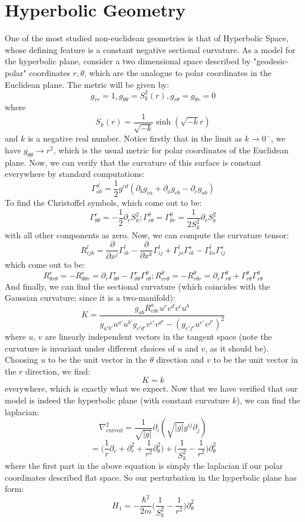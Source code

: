 \documentclass[12pt]{article}
\begin{document}
\section{Hyperbolic Geometry}
One of the most studied non-euclidean geometries is that of Hyperbolic Space, whose defining feature is a constant negative sectional curvature. As a model for the hyperbolic plane, consider a two dimensional space described by "geodesic-polar" coordinates $r, \theta$, which are the analogue to polar coordinates in the Euclidean plane. The metric will be given by:
$$g_{rr} = 1, g_{\theta \theta} = S_k^2(r), g_{r \theta} = g_{\theta r} = 0$$
where
$$S_k(r) = \frac{1}{\sqrt{-k}} \sinh(\sqrt{-k} r)$$
and $k$ is a negative real number. Notice firstly that in the limit as $k \to 0^-$, we have $g_{\theta \theta} \to r^2$, which is the usual metric for polar coordinates of the Euclidean plane. Now, we can verify that the curvature of this surface is constant everywhere by standard computations:
$$\Gamma^d_{ab} = \frac{1}{2} g^{cd}(\partial_b g_{ca} + \partial_a g_{cb} - \partial_c g_{ab})$$
To find the Christoffel symbols, which come out to be:
$$\Gamma^{r}_{\theta \theta} = - \frac{1}{2} \partial_r S_k^2; \Gamma^\theta_{r \theta} = \Gamma^\theta_{\theta r} = \frac{1}{2 S_k^2} \partial_r S_k^2$$
with all other components as zero. Now, we can compute the curvature tensor:
$$R^l_{ijk} = \frac{\partial}{\partial x^j} \Gamma^{l}_{ik} - \frac{\partial}{\partial x^k} \Gamma^l_{ij} + \Gamma^l_{js}\Gamma^s_{ik} - \Gamma^l_{ks} \Gamma^s_{ij}$$
which come out to be:
$$R^r_{\theta r \theta} = -R^r_{\theta \theta r} = \partial_r \Gamma^r_{\theta \theta} - \Gamma^r_{\theta \theta} \Gamma^\theta_{r \theta}; R^{\theta}_{r r \theta} = - R^\theta_{r \theta r} = \partial_r \Gamma^\theta_{r \theta} + \Gamma^{\theta}_{r \theta}\Gamma^{\theta}_{r \theta}$$
And finally, we can find the sectional curvature (which coincides with the Gaussian curvature; since it is a two-manifold):
$$K = \frac{g_{ab}R^{a}_{cde}u^ev^dv^cu^b}{g_{a'b'}u^{a'}u^{b'}g_{c'd'}v^{c'}v^{d'} - (g_{e'f'}u^{e'}v^{f'})^2}$$
where $u$, $v$ are linearly independent vectors in the tangent space (note the curvature is invariant under different choices of $u$ and $v$, as it should be). Choosing $u$ to be the unit vector in the $\theta$ direction and $v$ to be the unit vector in the $r$ direction, we find:
$$K = k$$
everywhere, which is exactly what we expect. Now that we have verified that our model is indeed the hyperbolic plane (with constant curvature $k$), we can find the laplacian:
$$\nabla^2_{\text{curved}} = \frac{1}{\sqrt{|g|}} \partial_i (\sqrt{|g|} g^{ij} \partial_j)$$
$$= \bigg(\frac{1}{r} \partial_r + \partial_r^2 + \frac{1}{r^2} \partial_{\theta}^2 \bigg) + \bigg(\frac{1}{S_k^2} - \frac{1}{r^2}\bigg)\partial_\theta^2$$
where the first part in the above equation is simply the laplacian if our polar coordinates described flat space. So our perturbation in the hyperbolic plane has form:
$$H_1 = - \frac{\hbar^2}{2m} \bigg( \frac{1}{S_k^2} - \frac{1}{r^2} \bigg) \partial_\theta^2$$
\end{document}
